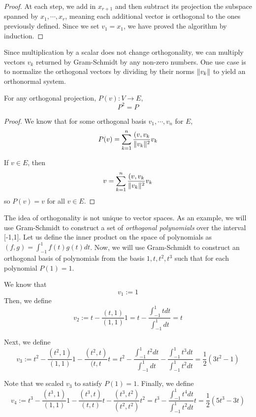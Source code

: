 \begin{proof}
At each step, we add in $x_{r + 1}$ and then subtract its projection the subspace spanned by $x_{1}, \cdots, x_{r}$, meaning each additional vector is orthogonal to the ones previously defined. Since we set $v_{1} = x_{1}$, we have proved the algorithm by induction. 
\end{proof}

Since multiplication by a scalar does not change orthogonality, we can multiply vectors $v_{k}$ returned by Gram-Schmidt by any non-zero numbers. One use case is to normalize the orthogonal vectors by dividing by their norms $\lVert v_{k}\rVert$ to yield an orthonormal system. 

\begin{theorem}
For any orthogonal projection, $P(v): V \rightarrow E$, $$P^{2} = P$$
\end{theorem}

\begin{proof}
We know that for some orthogonal basis $v_{1}, \cdots, v_{n}$ for $E$, 
$$P(v) = \sum_{k=1}^{n} \frac{(v, v_{k}}{\lVert v_{k}\rVert^{2}} v_{k}$$

If $v \in E$, then 
$$v = \sum_{k=1}^{n} \frac{(v, v_{k}}{\lVert v_{k}\rVert^{2}} v_{k}$$
so $P(v) = v$ for all $v \in E$. 
\end{proof}

The idea of orthogonality is not unique to vector spaces. As an example, we will use Gram-Schmidt to construct a set of \textit{orthogonal polynomials} over the interval [-1,1]. Let us define the inner product on the space of polynomials as $(f, g) = \int_{-1}^{1} f(t) g(t) dt$. Now, we will use Gram-Schmidt to construct an orthogonal basis of polynomials from the basis $1, t, t^{2}, t^{3}$ such that for each polynomial $P(1) = 1$.

We know that 
$$v_{1} := 1$$
Then, we define 
$$v_{2} := t - \frac{(t, 1)}{(1, 1)} 1 = t - \frac{\int_{-1}^{1} t dt}{\int_{-1}^{1} dt} = t
$$

Next, we define 
$$v_{3} := t^{2} - \frac{(t^{2}, 1)}{(1, 1)} 1 - \frac{(t^{2}, t)}{(t, t} t = t^{2} - \frac{\int_{-1}^{1} t^{2} dt}{\int_{-1}^{1} dt} - \frac{\int_{-1}^{1} t^{3} dt}{\int_{-1}^{1} t^{2} dt} = \frac{1}{2} (3t^{2} - 1)$$

Note that we scaled $v_{3}$ to satisfy $P(1) = 1$. Finally, we define 
$$v_{4} := t^{3} - \frac{(t^{3}, 1)}{(1, 1)} 1 - \frac{(t^{3}, t)}{(t, t)} t - \frac{(t^{3}, t^{2})}{(t^{2}, t^{2})} t^{2} = t^{3} - \frac{\int_{-1}^{1} t^{4} dt}{\int_{-1}^{1} t^{2} dt} t = \frac{1}{2} (5t^{3} - 3t)$$

